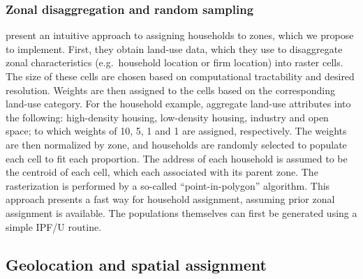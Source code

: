 \documentclass[11pt,twoside]{article}
\numberwithin{equation}{section}
\newcommand{\?}{\stackrel{?}{=}}
\begin{document}
\subsubsection{Zonal disaggregation and random sampling}
\textcite{moekel2003microsimulation} present an intuitive approach to assigning households to zones, which we propose to implement.
First, they obtain land-use data, which they use to disaggregate zonal characteristics (e.g.\ household location or firm location) into raster cells.
The size of these cells are chosen based on computational tractability and desired resolution.
Weights are then assigned to the cells based on the corresponding land-use category.
For the household example, \textcite{moekel2003microsimulation} aggregate land-use attributes into the following: high-density housing, low-density housing, industry and open space;
to which weights of 10, 5, 1 and 1 are assigned, respectively.
The weights are then normalized by zone, and households are randomly selected to populate each cell to fit each proportion.
The address of each household is assumed to be the centroid of each cell, which each associated with its parent zone.
The rasterization is performed by a so-called ``point-in-polygon'' algorithm.
This approach presents a fast way for household assignment, assuming prior zonal assignment is available.
The populations themselves can first be generated using a simple IPF/U routine.

\subsection{Geolocation and spatial assignment}
\end{document}
